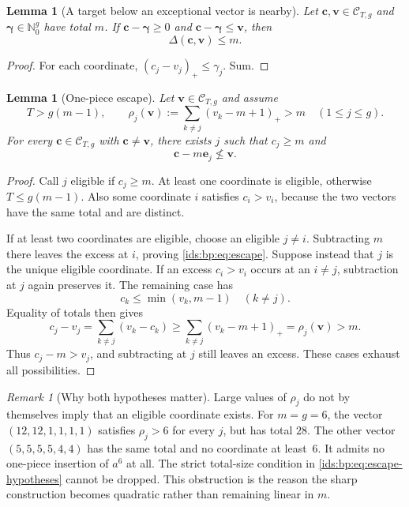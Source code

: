 \documentclass[11pt,letterpaper]{article}
\newtheorem{lemma}[theorem]{Lemma}
\theoremstyle{definition}\newtheorem{definition}[theorem]{Definition}
\theoremstyle{remark}\newtheorem{remark}[theorem]{Remark}
\theoremstyle{definition}\newtheorem{question}[theorem]{Question}
\newcommand{\Nzero}{\mathbb N_0}
\newcommand{\bppos}[1]{(#1)_+}
\newcommand{\bpC}[2]{\mathcal C_{#1,#2}}
\begin{document}
\begin{lemma}[A target below an exceptional vector is nearby]
\label{ids:bp:lem:near}
Let $\mathbf c,\mathbf v\in\bpC{T}{g}$ and
$\boldsymbol\gamma\in\Nzero^g$ have total $m$. If
$\mathbf c-\boldsymbol\gamma\geq0$ and
$\mathbf c-\boldsymbol\gamma\leq\mathbf v$, then
\[
 \Delta(\mathbf c,\mathbf v)\leq m.
\]
\end{lemma}
\begin{proof}
For each coordinate, $(c_j-v_j)_+\leq\gamma_j$. Sum.
\end{proof}

\begin{lemma}[One-piece escape]
\label{ids:bp:lem:escape}
Let $\mathbf v\in\bpC{T}{g}$ and assume
\begin{equation}
 T>g(m-1),\qquad
 \rho_j(\mathbf v):=\sum_{k\ne j}\bppos{v_k-m+1}>m
 \quad(1\leq j\leq g).
 \label{ids:bp:eq:escape-hypotheses}
\end{equation}
For every $\mathbf c\in\bpC{T}{g}$ with $\mathbf c\ne\mathbf v$, there
exists $j$ such that $c_j\geq m$ and
\begin{equation}
 \mathbf c-m\mathbf e_j\not\leq\mathbf v.
 \label{ids:bp:eq:escape}
\end{equation}
\end{lemma}
\begin{proof}
Call $j$ eligible if $c_j\geq m$. At least one coordinate is eligible,
otherwise $T\leq g(m-1)$. Also some coordinate $i$ satisfies $c_i>v_i$,
because the two vectors have the same total and are distinct.

If at least two coordinates are eligible, choose an eligible $j\ne i$.
Subtracting $m$ there leaves the excess at $i$, proving
\eqref{ids:bp:eq:escape}. Suppose instead that $j$ is the unique eligible
coordinate. If an excess $c_i>v_i$ occurs at an $i\ne j$, subtraction at $j$
again preserves it. The remaining case has
\[
 c_k\leq\min(v_k,m-1)\quad(k\ne j).
\]
Equality of totals then gives
\[
 c_j-v_j=\sum_{k\ne j}(v_k-c_k)
 \geq\sum_{k\ne j}\bppos{v_k-m+1}=\rho_j(\mathbf v)>m.
\]
Thus $c_j-m>v_j$, and subtracting at $j$ still leaves an excess.
These cases exhaust all possibilities.
\end{proof}

\begin{remark}[Why both hypotheses matter]
\label{ids:bp:rem:escape-guardrail}
Large values of $\rho_j$ do not by themselves imply that an eligible coordinate
exists. For $m=g=6$, the vector $(12,12,1,1,1,1)$ satisfies $\rho_j>6$ for
every $j$, but has total $28$. The other vector $(5,5,5,5,4,4)$ has the same
total and no coordinate at least~$6$. It admits no one-piece insertion of
$a^6$ at all. The strict total-size condition in
\eqref{ids:bp:eq:escape-hypotheses} cannot be dropped. This obstruction is the
reason the sharp construction becomes quadratic rather than remaining linear
in $m$.
\end{remark}
\end{document}
